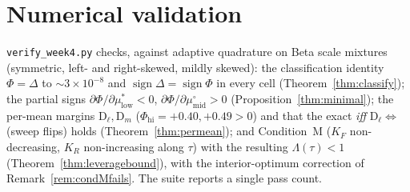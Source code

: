 \documentclass[11pt,reqno]{amsart}
\theoremstyle{plain}
\theoremstyle{definition}
\theoremstyle{remark}
\theoremstyle{remark}\newtheorem{observation}{Observation}
\newcommand{\KR}{K_R}\newcommand{\KF}{K_F}\newcommand{\KM}{K_M}
\newcommand{\mustar}{\mu^{*}_{\mathrm{low}}}\newcommand{\mumid}{\mu^{\circ}_{\mathrm{mid}}}
\begin{document}
\section{Numerical validation}\label{sec:num}

\texttt{verify\_week4.py} checks, against adaptive quadrature on Beta scale mixtures
(symmetric, left- and right-skewed, mildly skewed): the classification identity
$\Phi=\Delta$ to $\sim3\times10^{-8}$ and $\operatorname{sign}\Delta=\operatorname{sign}\Phi$ in
every cell (Theorem~\ref{thm:classify}); the partial signs
$\partial\Phi/\partial\mustar<0$, $\partial\Phi/\partial\mumid>0$
(Proposition~\ref{thm:minimal}); the per-mean margins $\mathrm{D}_\ell,\mathrm{D}_m$
($\Phi_{\mathrm{hi}}=+0.40,+0.49>0$) and that the exact \emph{iff}
$\mathrm{D}_\ell\Leftrightarrow$ (sweep flips) holds (Theorem~\ref{thm:permean});
and Condition~M
($\KF$ non-decreasing, $\KR$ non-increasing along $\tau$) with the resulting
$\Lambda(\tau)<1$ (Theorem~\ref{thm:leveragebound}), with the interior-optimum correction of
Remark~\ref{rem:condMfails}. The suite reports a single pass count.
\end{document}
